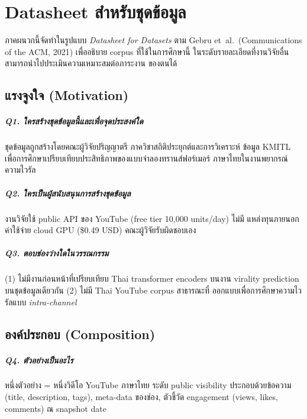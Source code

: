 \chapter{Datasheet สำหรับชุดข้อมูล}
\label{app:datasheet}

ภาคผนวกนี้จัดทำในรูปแบบ \emph{Datasheet for Datasets} ตาม Gebru et~al.\
(Communications of the ACM, 2021) เพื่ออธิบาย corpus ที่ใช้ในการศึกษานี้
ในระดับรายละเอียดที่งานวิจัยอื่นสามารถนำไปประเมินความเหมาะสมต่อภาระงาน
ของตนได้

\section{แรงจูงใจ (Motivation)}

\paragraph{Q1. ใครสร้างชุดข้อมูลนี้และเพื่อจุดประสงค์ใด}
ชุดข้อมูลถูกสร้างโดยคณะผู้วิจัยปริญญาตรี ภาควิชาสถิติประยุกต์และการวิเคราะห์
ข้อมูล KMITL เพื่อการศึกษาเปรียบเทียบประสิทธิภาพของแบบจำลองทรานส์ฟอร์เมอร์
ภาษาไทยในงานพยากรณ์ความไวรัล

\paragraph{Q2. ใครเป็นผู้สนับสนุนการสร้างชุดข้อมูล}
งานวิจัยใช้ public API ของ YouTube (free tier 10{,}000 units/day) ไม่มี
แหล่งทุนภายนอก ค่าใช้จ่าย cloud GPU (\$0.49 USD) คณะผู้วิจัยรับผิดชอบเอง

\paragraph{Q3. ตอบช่องว่างใดในวรรณกรรม}
(1) ไม่มีงานก่อนหน้าที่เปรียบเทียบ Thai transformer encoders บนงาน virality
prediction บนชุดข้อมูลเดียวกัน (2) ไม่มี Thai YouTube corpus สาธารณะที่
ออกแบบเพื่อการศึกษาความไวรัลแบบ \emph{intra-channel}

\section{องค์ประกอบ (Composition)}

\paragraph{Q4. ตัวอย่างเป็นอะไร}
หนึ่งตัวอย่าง = หนึ่งวิดีโอ YouTube ภาษาไทย ระดับ public visibility
ประกอบด้วยข้อความ (title, description, tags), meta-data ของช่อง,
ตัวชี้วัด engagement (views, likes, comments) ณ snapshot date

